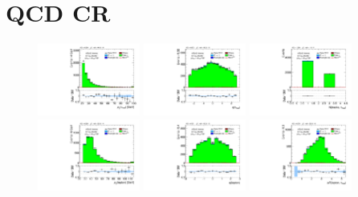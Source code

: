 \clearpage

\section{QCD CR}

\begin{figure}[!htpb]
  \centering
  \includegraphics[width=0.30\textwidth]{figures/analysis/vbf-QCDCR/tau-pt}
  \includegraphics[width=0.30\textwidth]{figures/analysis/vbf-QCDCR/tau-eta}
  \includegraphics[width=0.30\textwidth]{figures/analysis/vbf-QCDCR/tau-numTrack} \\
  \includegraphics[width=0.30\textwidth]{figures/analysis/vbf-QCDCR/lep-pt-hi}
  \includegraphics[width=0.30\textwidth]{figures/analysis/vbf-QCDCR/lep-eta}
  \includegraphics[width=0.30\textwidth]{figures/analysis/vbf-QCDCR/taulep-dR} \\

\end{figure}
